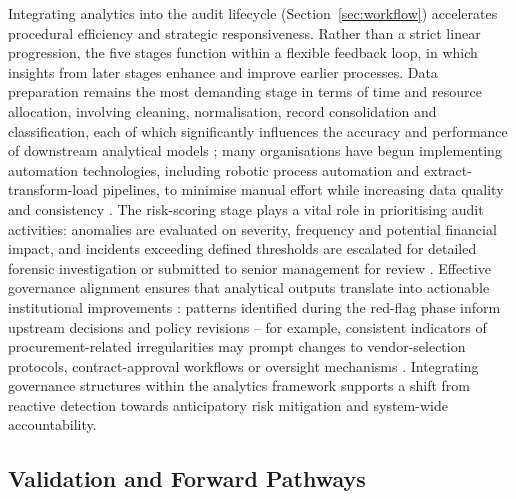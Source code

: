 \documentclass[preprint,12pt]{elsarticle}
\begin{document}
Integrating analytics into the audit lifecycle (Section~\ref{sec:workflow}) accelerates procedural efficiency and strategic responsiveness. Rather than a strict linear progression, the five stages function within a flexible feedback loop, in which insights from later stages enhance and improve earlier processes. Data preparation remains the most demanding stage in terms of time and resource allocation, involving cleaning, normalisation, record consolidation and classification, each of which significantly influences the accuracy and performance of downstream analytical models \citep{joshi2021}; many organisations have begun implementing automation technologies, including robotic process automation and extract-transform-load pipelines, to minimise manual effort while increasing data quality and consistency \citep{vajpayee2023}. The risk-scoring stage plays a vital role in prioritising audit activities: anomalies are evaluated on severity, frequency and potential financial impact, and incidents exceeding defined thresholds are escalated for detailed forensic investigation or submitted to senior management for review \citep{henriques2024}. Effective governance alignment ensures that analytical outputs translate into actionable institutional improvements \citep{carreno2024}: patterns identified during the red-flag phase inform upstream decisions and policy revisions -- for example, consistent indicators of procurement-related irregularities may prompt changes to vendor-selection protocols, contract-approval workflows or oversight mechanisms \citep{sarkola2023}. Integrating governance structures within the analytics framework supports a shift from reactive detection towards anticipatory risk mitigation and system-wide accountability.

\subsection{Validation and Forward Pathways}
\end{document}
